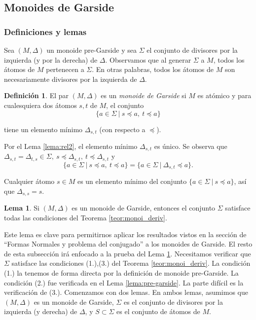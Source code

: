 \documentclass[12pt]{article}
\theoremstyle{definition}
\newtheorem{defi}{Definición}[section]
\newtheorem{lema}{Lema}[section]
\begin{document}
\subsection{Monoides de Garside}
\subsubsection{Definiciones y lemas}

Sea $(M,\Delta)$ un monoide pre-Garside y sea $\Sigma$ el conjunto de divisores por la izquierda (y por la derecha) de $\Delta$. Observamos que al generar $\Sigma$ a $M$, todos los átomos de $M$ pertenecen a $\Sigma$. En otras palabras, todos los átomos de $M$ son necesariamente divisores por la izquierda de $\Delta$.

\begin{defi}
El par $(M,\Delta)$ es un \textit{monoide de Garside} si $M$ es atómico y para cualesquiera dos átomos $s,t$ de $M$, el conjunto
$$\{a\in\Sigma\ |\ s\preceq a,\ t\preceq a \}$$

tiene un elemento mínimo $\Delta_{s,t}$ (con respecto a $\preceq$).

Por el Lema \ref{lema:rel2}, el elemento mínimo $\Delta_{s,t}$ es único. Se observa que $\Delta_{s,t}=\Delta_{t,s}\in\Sigma,\ s\preceq\Delta_{s,t},\ t\preceq\Delta_{s,t}$ y 
$$\{a\in\Sigma\ |\ s\preceq a,\ t\preceq a \}=\{a\in\Sigma\ |\ \Delta_{s,t}\preceq a\}.$$

Cualquier átomo $s\in M$ es un elemento mínimo del conjunto $\{a\in\Sigma\ |\ s\preceq a\}$, así que $\Delta_{s,s}=s$.
\label{defi:garside}
\end{defi}

\begin{lema}
Si $(M,\Delta)$ es un monoide de Garside, entonces el conjunto $\Sigma$ satisface todas las condiciones del Teorema \ref{teor:monoi_deriv}.
\label{lema:garside}
\end{lema}

Este lema es clave para permitirnos aplicar los resultados vistos en la sección de ``Formas Normales y problema del conjugado'' a los monoides de Garside. El resto de esta subsección irá enfocado a la prueba del Lema \ref{lema:garside}. Necesitamos verificar que $\Sigma$ satisface las condiciones (1.),(3.) del Teorema \ref{teor:monoi_deriv}. La condición (1.) la tenemos de forma directa por la definición de monoide pre-Garside. La condición (2.) fue verificada en el Lema \ref{lema:pre-garside}. La parte difícil es la verificación de (3.). Comenzamos con dos lemas. En ambos lemas, asumimos que $(M,\Delta)$ es un monoide de Garside, $\Sigma$ es el conjunto de divisores por la izquierda (y derecha) de $\Delta$, y $S\subset \Sigma$ es el conjunto de átomos de $M$.
\end{document}
